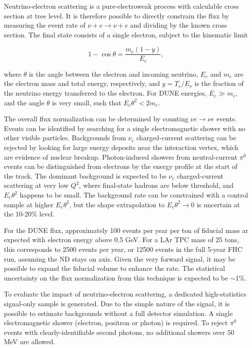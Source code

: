 Neutrino-electron scattering is a pure-electroweak process with calculable cross section at tree level. It is therefore possible to directly constrain the flux by measuring the event rate of $\nu+ e \rightarrow \nu +e$ and dividing by the known cross section. The final state consists of a single electron, subject to the kinematic limit 

\begin{equation}
1 - \cos \theta = \frac{m_{e}(1-y)}{E_{e}},
\end{equation}

where $\theta$ is the angle between the electron and incoming neutrino, $E_{e}$ and $m_{e}$ are the electron mass and total energy, respectively, and $y = T_{e}/E_{\nu}$ is the fraction of the neutrino energy transferred to the electron. For DUNE energies, $E_{e} \gg m_{e}$, and the angle $\theta$ is very small, such that $E_{e}\theta^{2} < 2m_{e}$.

The overall flux normalization can be determined by counting $\nu e \rightarrow \nu e$ events. Events can be identified by searching for a single electromagnetic shower with no other visible particles. Backgrounds from $\nu_{e}$ charged-current scattering can be rejected by looking for large energy deposits near the interaction vertex, which are evidence of nuclear breakup. Photon-induced showers from neutral-current $\pi^{0}$ events can be distinguished from electrons by the energy profile at the start of the track. The dominant background is expected to be $\nu_{e}$ charged-current scattering at very low $Q^{2}$, where final-state hadrons are below threshold, and $E_{e}\theta^{2}$ happens to be small. The background rate can be constrained with a control sample at higher $E_{e}\theta^{2}$, but the shape extrapolation to $E_{e}\theta^{2} \rightarrow 0$ is uncertain at the 10-20\% level.

For the DUNE flux, approximately 100 events per year per ton of fiducial mass ar expected with electron energy above 0.5 GeV. For a LAr TPC mass of 25 tons, this corresponds to 2500 events per year, or 12500 events in the full 5-year FHC run, assuming the ND stays on axis. Given the very forward signal, it may be possible to expand the fiducial volume to enhance the rate. The statistical uncertainty on the flux normalization from this technique is expected to be $\sim$1\%.

To evaluate the impact of neutrino-electron scattering, a dedicated high-statistics signal-only sample is generated. Due to the simple nature of the signal, it is possible to estimate backgrounds without a full detector simulation. A single electromagnetic shower (electron, positron or photon) is required. To reject $\pi^{0}$ events with clearly-identifiable second photons, no additional showers over 50 MeV are allowed.

